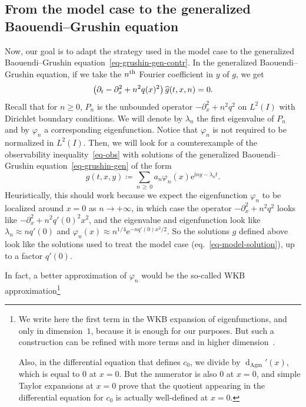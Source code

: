 \documentclass[AHL,Unicode,longabstracts,published]{cedram}
\renewcommand{\geq}{\geqslant}
\newcommand{\1}{\mathds 1}
\newcommand{\dagmon}{\mathop{\mathrm{d}}\nolimits_{\mathrm{Agm}}}
\newcommand{\eu}{\mathrm e}
\newcommand{\iu}{\mathrm i}
\renewcommand{\l}{\lambda}
\newcommand{\f}{\varphi}
\let\oldhat\hat
\renewcommand*{\hat}[1]{\mathchoice{\widehat{#1}}{\widehat{#1}}{\oldhat{#1}}{\oldhat{#1}}}
\begin{document}
\subsection{From the model case to the generalized Baouendi--Grushin equation}\label{sec-sketch-gen}

Now, our goal is to adapt the strategy used in the model case to the generalized Baouendi--Grushin equation~\eqref{eq-grushin-gen-contr}. In the generalized Baouendi--Grushin equation, if we take the $n^{\rm th}$ Fourier coefficient in $y$ of $g$, we get
\begin{equation}\label{eq-grushin-gen-fourier}
\left(\partial_t -\partial_x^2 +n^2q(x)^2\right)\hat g(t,x,n) = 0.
\end{equation}
Recall that for $n\geq 0$, $P_n$ is the unbounded operator $-\partial_x^2 + n^2 q^2$ on $L^2(I)$ with Dirichlet boundary conditions. We will denote by $\l_n$ the first eigenvalue of $P_n$ and by $\f_n$ a corresponding eigenfunction. Notice that $\f_n$ is not required to be normalized in $L^2(I)$. Then, we will look for a counterexample of the observability inequality~\eqref{eq-obs} with solutions of the generalized Baouendi--Grushin equation~\eqref{eq-grushin-gen} of the form
\begin{equation}\label{eq-obs-counter}
g(t,x,y) \coloneqq \sum_{n\,\geq\,0} a_{n} \f_n(x) \eu^{\iu n y - \lambda_n t}.
\end{equation}
Heuristically, this should work because we expect the eigenfunction $\f_n$ to be localized around $x = 0$ as $n\to +\infty$, in which case the operator $-\partial_x^2 + n^2 q^2$ looks like $-\partial_x^2 +n^2 q'(0)^2 x^2$, and the eigenvalue and eigenfunction look like $\l_n \approx nq'(0)$ and $\f_n(x) \approx n^{1/4} \eu^{-nq'(0)x^2\!/2}$. So the solutions $g$ defined above look like the solutions used to treat the model case (eq.~\eqref{eq-model-solution}), up to a factor $q'(0)$.

In fact, a better approximation of $\f_n$ would be the so-called WKB approximation\footnote{
We write here the first term in the WKB expansion of eigenfunctions, and only in dimension~$1$, because it is enough for our purposes. But such a construction can be refined with more terms and in higher dimension~\cite[Chapter~3 \& Chapter~6, Theorem~A.3]{DS99}.

Also, in the differential equation that defines $c_0$, we divide by $\dagmon'(x)$, which is equal to $0$ at $x = 0$. But the numerator is also $0$ at $x = 0$, and simple Taylor expansions at $x=0$ prove that the quotient appearing in the differential equation for $c_0$ is actually well-defined at $x=0$.
}
\end{document}
